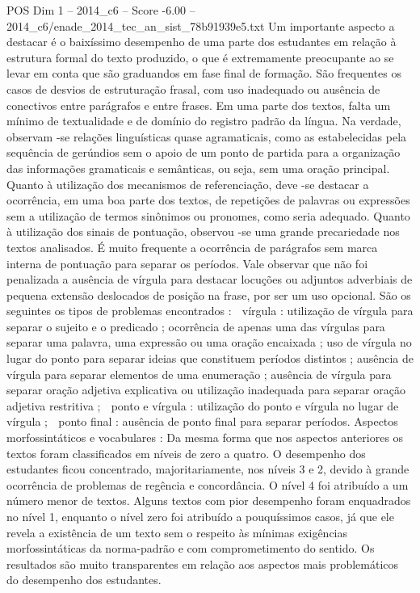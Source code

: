 \begin{textsample}{POS Dim 1 – 2014\_c6 – Score -6.00 – 2014\_c6/enade\_2014\_tec\_an\_sist\_78b91939e5.txt}
Um importante aspecto a destacar é o baixíssimo desempenho de uma parte dos estudantes em relação à estrutura formal do texto produzido, o que é extremamente preocupante ao se levar em conta que são graduandos em fase final de formação.
São frequentes os casos de desvios de estruturação frasal, com uso inadequado ou ausência de conectivos entre parágrafos e entre frases.
Em uma parte dos textos, falta um mínimo de textualidade e de domínio do registro padrão da língua.
Na verdade, observam -se relações linguísticas quase agramaticais, como as estabelecidas pela sequência de gerúndios sem o apoio de um ponto de partida para a organização das informações gramaticais e semânticas, ou seja, sem uma oração principal.
Quanto à utilização dos mecanismos de referenciação, deve -se destacar a ocorrência, em uma boa parte dos textos, de repetições de palavras ou expressões sem a utilização de termos sinônimos ou pronomes, como seria adequado.
Quanto à utilização dos sinais de pontuação, observou -se uma grande precariedade nos textos analisados.
É muito frequente a ocorrência de parágrafos sem marca interna de pontuação para separar os períodos.
Vale observar que não foi penalizada a ausência de vírgula para destacar locuções ou adjuntos adverbiais de pequena extensão deslocados de posição na frase, por ser um uso opcional.
São os seguintes os tipos de problemas encontrados :  vírgula : utilização de vírgula para separar o sujeito e o predicado ; ocorrência de apenas uma das vírgulas para separar uma palavra, uma expressão ou uma oração encaixada ; uso de vírgula no lugar do ponto para separar ideias que constituem períodos distintos ; ausência de vírgula para separar elementos de uma enumeração ; ausência de vírgula para separar oração adjetiva explicativa ou utilização inadequada para separar oração adjetiva restritiva ;  ponto e vírgula : utilização do ponto e vírgula no lugar de vírgula ;  ponto final : ausência de ponto final para separar períodos.
Aspectos morfossintáticos e vocabulares : Da mesma forma que nos aspectos anteriores os textos foram classificados em níveis de zero a quatro.
O desempenho dos estudantes ficou concentrado, majoritariamente, nos níveis 3 e 2, devido à grande ocorrência de problemas de regência e concordância.
O nível 4 foi atribuído a um número menor de textos.
Alguns textos com pior desempenho foram enquadrados no nível 1, enquanto o nível zero foi atribuído a pouquíssimos casos, já que ele revela a existência de um texto sem o respeito às mínimas exigências morfossintáticas da norma-padrão e com comprometimento do sentido.
Os resultados são muito transparentes em relação aos aspectos mais problemáticos do desempenho dos estudantes.

\end{textsample}
